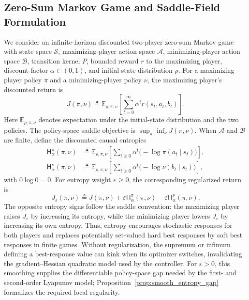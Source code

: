 \documentclass{article}
\theoremstyle{remark}
\newcommand{\E}{\mathbb{E}}
\begin{document}
\subsection{Zero-Sum Markov Game and Saddle-Field Formulation}\label{subsec:formulation}

We consider an infinite-horizon discounted two-player zero-sum Markov game with state space $\mathcal{S}$, maximizing-player action space $\mathcal{A}$, minimizing-player action space $\mathcal{B}$, transition kernel $P$, bounded reward $r$ to the maximizing player, discount factor $\alpha\in(0,1)$, and initial-state distribution $\rho$.
For a maximizing-player policy $\pi$ and a minimizing-player policy $\nu$, the maximizing player's discounted return is
\[
J(\pi,\nu)
\triangleq
\E_{\rho,\pi,\nu}
\!\left[
\textstyle\sum_{t=0}^{\infty}\alpha^{t}r(s_{t},a_{t},b_{t})
\right].
\]
Here $\E_{\rho,\pi,\nu}$ denotes expectation under the initial-state distribution and the two policies.
The policy-space saddle objective is $\sup_{\pi}\inf_{\nu} J(\pi,\nu)$.
When $\mathcal A$ and $\mathcal B$ are finite, define the discounted causal entropies
\begin{align*}
\mathsf H_{\alpha}^{\pi}(\pi,\nu)
&\triangleq \E_{\rho,\pi,\nu}\!\left[\sum_{t\ge0}\alpha^t
\bigl(-\log\pi(a_t\mid s_t)\bigr)\right],\\
\mathsf H_{\alpha}^{\nu}(\pi,\nu)
&\triangleq \E_{\rho,\pi,\nu}\!\left[\sum_{t\ge0}\alpha^t
\bigl(-\log\nu(b_t\mid s_t)\bigr)\right],
\end{align*}
with $0\log0=0$.
For entropy weight $\varepsilon\ge0$, the corresponding regularized return is
\begin{equation}\label{eq:entropic_return}
J_{\varepsilon}(\pi,\nu)
\triangleq J(\pi,\nu)
+\varepsilon\mathsf H_{\alpha}^{\pi}(\pi,\nu)
-\varepsilon\mathsf H_{\alpha}^{\nu}(\pi,\nu).
\end{equation}
The opposite entropy signs follow the saddle convention: the maximizing player raises $J_\varepsilon$ by increasing its entropy, while the minimizing player lowers $J_\varepsilon$ by increasing its own entropy.
Thus, entropy encourages stochastic responses for both players and replaces potentially set-valued hard best responses by soft best responses in finite games.
Without regularization, the supremum or infimum defining a best-response value can kink when its optimizer switches, invalidating the gradient--Hessian quadratic model used by the controller.
For $\varepsilon>0$, this smoothing supplies the differentiable policy-space gap needed by the first- and second-order Lyapunov model; Proposition~\ref{prop:smooth_entropy_gap} formalizes the required local regularity.
\end{document}
